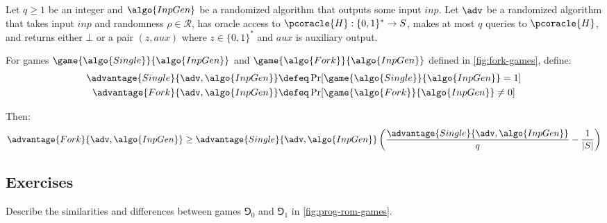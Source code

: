 \begin{lemma}\label{lem:fork}
  Let $q \geq 1$ be an integer and $\algo{InpGen}$ be a randomized algorithm that outputs some input $\mathit{inp}$.
  Let $\adv$ be a randomized algorithm that takes input $\mathit{inp}$ and randomness $\rho \in \mathcal{R}$, has oracle access to $\pcoracle{H}: \{0,1\}^* \rightarrow S$, makes at most $q$ queries to $\pcoracle{H}$, and returns either $\bot$ or a pair $(z, \mathit{aux})$ where $z \in \{0,1\}^*$ and $\mathit{aux}$ is auxiliary output.
  
  For games $\game{\algo{Single}}{\algo{InpGen}}$ and $\game{\algo{Fork}}{\algo{InpGen}}$ defined in \autoref{fig:fork-games}, define:
  \begin{align*}
    \advantage{Single}{\adv, \algo{InpGen}} &\defeq \Pr[\game{\algo{Single}}{\algo{InpGen}} = 1] \\
    \advantage{Fork}{\adv, \algo{InpGen}} &\defeq \Pr[\game{\algo{Fork}}{\algo{InpGen}} \neq 0]
  \end{align*}
  
  Then:
  \[
  \advantage{Fork}{\adv, \algo{InpGen}} \geq \advantage{Single}{\adv, \algo{InpGen}} \left( \frac{\advantage{Single}{\adv, \algo{InpGen}}}{q} - \frac{1}{|S|} \right)
  \]
\end{lemma}

\subsection{Exercises}

\begin{exercise}
  Describe the similarities and differences between games $\Game_0$ and $\Game_1$ in \autoref{fig:prog-rom-games}.
\end{exercise}

